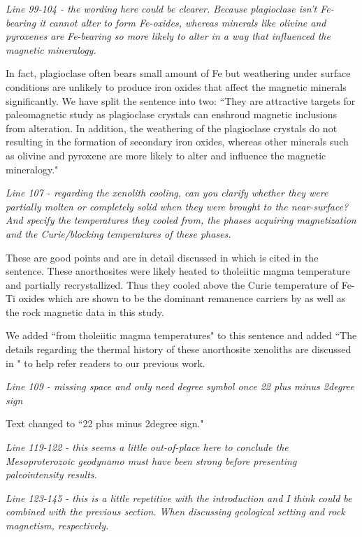 \documentclass[11pt, letterpaper]{article}
\begin{document}
\begin{flushleft}
\textit{Line 99-104 - the wording here could be clearer. Because plagioclase isn't Fe-bearing it cannot alter to form Fe-oxides, whereas minerals like olivine and pyroxenes are Fe-bearing so more likely to alter in a way that influenced the magnetic mineralogy.}

In fact, plagioclase often bears small amount of Fe but weathering under surface conditions are unlikely to produce iron oxides that affect the magnetic minerals significantly. We have split the sentence into two: ``They are attractive targets for paleomagnetic study as plagioclase crystals can enshroud magnetic inclusions from alteration. In addition, the weathering of the plagioclase crystals do not resulting in the formation of secondary iron oxides, whereas other minerals such as olivine and pyroxene are more likely to alter and influence the magnetic mineralogy."

\textit{Line 107 - regarding the xenolith cooling, can you clarify whether they were partially molten or completely solid when they were brought to the near-surface? And specify the temperatures they cooled from, the phases acquiring magnetization and the Curie/blocking temperatures of these phases.}

These are good points and are in detail discussed in \cite{Zhang2021b} which is cited in the sentence. These anorthosites were likely heated to tholeiitic magma temperature and partially recrystallized. Thus they cooled above the Curie temperature of Fe-Ti oxides which are shown to be the dominant remanence carriers by \cite{Zhang2021a} as well as the rock magnetic data in this study. 

We added ``from tholeiitic magma temperatures" to this sentence and added ``The details regarding the thermal history of these anorthosite xenoliths are discussed in \cite{Zhang2021b}" to help refer readers to our previous work.

\textit{Line 109 - missing space and only need degree symbol once 22 {plus minus} 2{degree sign}}

Text changed to ``22 {plus minus} 2{degree sign}."

\textit{Line 119-122 - this seems a little out-of-place here to conclude the Mesoproterozoic geodynamo must have been strong before presenting paleointensity results.}



\textit{Line 123-145 - this is a little repetitive with the introduction and I think could be combined with the previous section. When discussing geological setting and rock magnetism, respectively.}


\end{flushleft}
\end{document}
